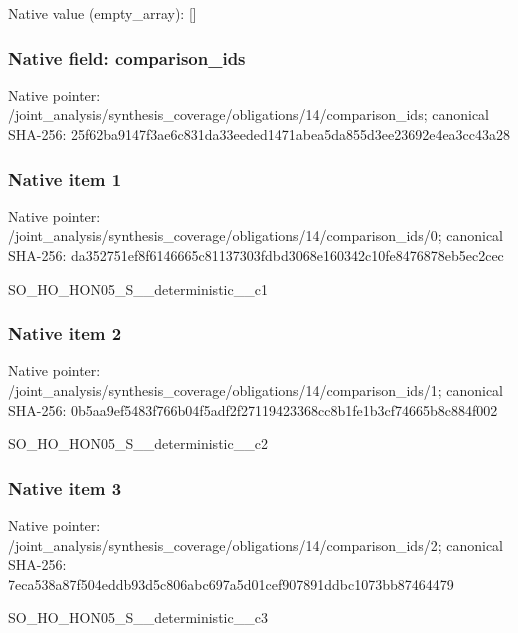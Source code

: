 \documentclass[10pt,a4paper]{article}
\begin{document}
Native value (empty\_\allowbreak{}array): []

\subsubsection{Native field: comparison\_\allowbreak{}ids}
Native pointer: /joint\_\allowbreak{}analysis/synthesis\_\allowbreak{}coverage/obligations/14/comparison\_\allowbreak{}ids; canonical SHA-256: 25f62ba9147f3ae6c831da33eeded1471abea5da855d3ee23692e4ea3cc43a28

\subsubsection{Native item 1}
Native pointer: /joint\_\allowbreak{}analysis/synthesis\_\allowbreak{}coverage/obligations/14/comparison\_\allowbreak{}ids/0; canonical SHA-256: da352751ef8f6146665c81137303fdbd3068e160342c10fe8476878eb5ec2cec

\begingroup\raggedright\sloppy SO\_\allowbreak{}HO\_\allowbreak{}HON05\_\allowbreak{}S\_\allowbreak{}\_\allowbreak{}deterministic\_\allowbreak{}\_\allowbreak{}c1\par\endgroup

\subsubsection{Native item 2}
Native pointer: /joint\_\allowbreak{}analysis/synthesis\_\allowbreak{}coverage/obligations/14/comparison\_\allowbreak{}ids/1; canonical SHA-256: 0b5aa9ef5483f766b04f5adf2f27119423368cc8b1fe1b3cf74665b8c884f002

\begingroup\raggedright\sloppy SO\_\allowbreak{}HO\_\allowbreak{}HON05\_\allowbreak{}S\_\allowbreak{}\_\allowbreak{}deterministic\_\allowbreak{}\_\allowbreak{}c2\par\endgroup

\subsubsection{Native item 3}
Native pointer: /joint\_\allowbreak{}analysis/synthesis\_\allowbreak{}coverage/obligations/14/comparison\_\allowbreak{}ids/2; canonical SHA-256: 7eca538a87f504eddb93d5c806abc697a5d01cef907891ddbc1073bb87464479

\begingroup\raggedright\sloppy SO\_\allowbreak{}HO\_\allowbreak{}HON05\_\allowbreak{}S\_\allowbreak{}\_\allowbreak{}deterministic\_\allowbreak{}\_\allowbreak{}c3\par\endgroup
\end{document}
